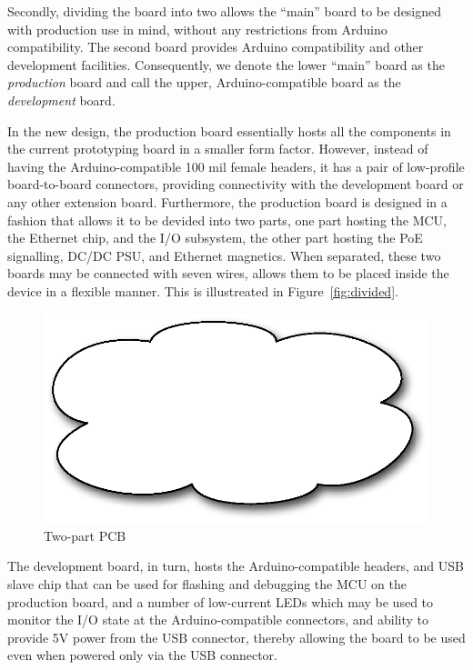 \documentclass[draft,a4paper]{siamltex}
\begin{document}
Secondly, dividing the board into two allows the ``main'' board to be
designed with production use in mind, without any restrictions from
Arduino compatibility.  The second board provides Arduino
compatibility and other development facilities.  Consequently, we denote
the lower ``main'' board as the {\it production} board and call the
upper, Arduino-compatible board as the {\it development} board.

In the new design, the production board essentially hosts all the
components in the current prototyping board in a smaller form factor.
However, instead of having the Arduino-compatible 100 mil female
headers, it has a pair of low-profile board-to-board connectors,
providing connectivity with the development board or any other
extension board.  Furthermore, the production board is designed in a
fashion that allows it to be devided into two parts, one part hosting
the MCU, the Ethernet chip, and the I/O subsystem, the other part hosting the
PoE signalling, DC/DC PSU, and Ethernet magnetics.  When separated,
these two boards may be connected with seven wires, allows them to be
placed inside the device in a flexible manner.  This is illustreated
in Figure~\ref{fig:divided}.

\begin{figure}
\centering
\includegraphics[scale=.4]{figure-divided.eps}
\caption{Two-part PCB}
\label{fig:stacking}
\end{figure}

The development board, in turn, hosts the Arduino-compatible headers,
and USB slave chip that can be used for flashing and debugging the MCU
on the production board, and a number of low-current LEDs which may be
used to monitor the I/O state at the Arduino-compatible connectors, and ability
to provide 5V power from the USB connector, thereby allowing the board
to be used even when powered only via the USB connector.
\end{document}
